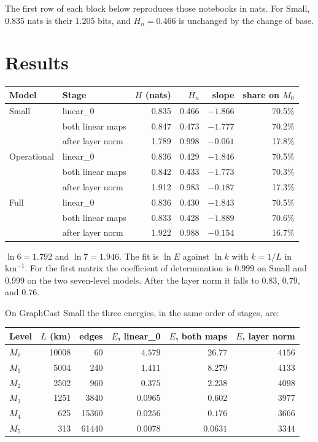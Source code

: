 \documentclass[11pt]{article}
\begin{document}
The first row of each block below reproduces those notebooks in nats. For Small, \(0.835\) nats is their \(1.205\) bits, and \(H_n = 0.466\) is unchanged by the change of base.

\section{Results}

\begin{center}
\begin{tabular}{llrrrr}
\toprule
Model & Stage & \(H\) (nats) & \(H_n\) & slope & share on \(M_0\) \\
\midrule
Small
  & linear\_0 & 0.835 & 0.466 & \(-1.866\) & 70.5\% \\
  & both linear maps & 0.847 & 0.473 & \(-1.777\) & 70.2\% \\
  & after layer norm & 1.789 & 0.998 & \(-0.061\) & 17.8\% \\
\addlinespace
Operational
  & linear\_0 & 0.836 & 0.429 & \(-1.846\) & 70.5\% \\
  & both linear maps & 0.842 & 0.433 & \(-1.773\) & 70.3\% \\
  & after layer norm & 1.912 & 0.983 & \(-0.187\) & 17.3\% \\
\addlinespace
Full
  & linear\_0 & 0.836 & 0.430 & \(-1.843\) & 70.5\% \\
  & both linear maps & 0.833 & 0.428 & \(-1.889\) & 70.6\% \\
  & after layer norm & 1.922 & 0.988 & \(-0.154\) & 16.7\% \\
\bottomrule
\end{tabular}
\end{center}

\(\ln 6 = 1.792\) and \(\ln 7 = 1.946\). The fit is \(\ln E\) against \(\ln k\) with \(k = 1/L\) in \(\mathrm{km}^{-1}\). For the first matrix the coefficient of determination is \(0.999\) on Small and \(0.999\) on the two seven-level models. After the layer norm it falls to \(0.83\), \(0.79\), and \(0.76\).

On GraphCast Small the three energies, in the same order of stages, are:

\begin{center}
\begin{tabular}{lrrrrr}
\toprule
Level & \(L\) (km) & edges & \(E\), linear\_0 & \(E\), both maps & \(E\), layer norm \\
\midrule
\(M_0\) & 10008 & 60 & \(4.579\) & \(26.77\) & \(4156\) \\
\(M_1\) & 5004 & 240 & \(1.411\) & \(8.279\) & \(4133\) \\
\(M_2\) & 2502 & 960 & \(0.375\) & \(2.238\) & \(4098\) \\
\(M_3\) & 1251 & 3840 & \(0.0965\) & \(0.602\) & \(3977\) \\
\(M_4\) & 625 & 15360 & \(0.0256\) & \(0.176\) & \(3666\) \\
\(M_5\) & 313 & 61440 & \(0.0078\) & \(0.0631\) & \(3344\) \\
\bottomrule
\end{tabular}
\end{center}
\end{document}
